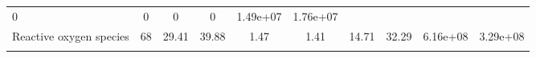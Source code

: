 \documentclass[]{article}
\begin{document}
\begin{longtable}[]{@{}lccccccccc@{}}
\begin{minipage}[t]{0.08\columnwidth}
0\strut
\end{minipage} & \begin{minipage}[t]{0.08\columnwidth}\centering\strut
0\strut
\end{minipage} & \begin{minipage}[t]{0.08\columnwidth}\centering\strut
0\strut
\end{minipage} & \begin{minipage}[t]{0.08\columnwidth}\centering\strut
0\strut
\end{minipage} & \begin{minipage}[t]{0.08\columnwidth}\centering\strut
1.49e+07\strut
\end{minipage} & \begin{minipage}[t]{0.08\columnwidth}\centering\strut
1.76e+07\strut
\end{minipage}\tabularnewline
\begin{minipage}[t]{0.07\columnwidth}\raggedright\strut
Reactive oxygen species\strut
\end{minipage} & \begin{minipage}[t]{0.06\columnwidth}\centering\strut
68\strut
\end{minipage} & \begin{minipage}[t]{0.08\columnwidth}\centering\strut
29.41\strut
\end{minipage} & \begin{minipage}[t]{0.08\columnwidth}\centering\strut
39.88\strut
\end{minipage} & \begin{minipage}[t]{0.08\columnwidth}\centering\strut
1.47\strut
\end{minipage} & \begin{minipage}[t]{0.08\columnwidth}\centering\strut
1.41\strut
\end{minipage} & \begin{minipage}[t]{0.08\columnwidth}\centering\strut
14.71\strut
\end{minipage} & \begin{minipage}[t]{0.08\columnwidth}\centering\strut
32.29\strut
\end{minipage} & \begin{minipage}[t]{0.08\columnwidth}\centering\strut
6.16e+08\strut
\end{minipage} & \begin{minipage}[t]{0.08\columnwidth}\centering\strut
3.29e+08\strut
\end{minipage}\tabularnewline
\begin{minipage}[t]{0.07\columnwidth}\raggedright\strut

\end{minipage}
\end{longtable}
\end{document}
